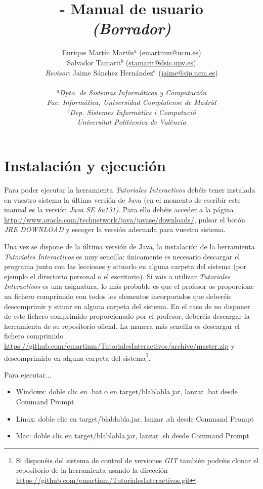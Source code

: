 \documentclass[]{article}
\title{\toolname{} - Manual de usuario \\ \emph{(Borrador)}}
\author{Enrique Martín Martín$^a$ (\url{emartinm@ucm.es}) \\ 
	Salvador Tamarit$^b$ (\url{stamarit@dsic.upv.es}) \\
	\emph{Revisor:} Jaime Sánchez Hernández$^a$ (\url{jaime@sip.ucm.es}) \\~\\[-.4cm]
	\normalsize{\emph{$^a$Dpto. de Sistemas Informáticos y Computación}}\\[-0.1cm]
	\normalsize{\emph{Fac. Informática, Universidad Complutense de Madrid}}\\[-0.1cm]
	\normalsize{\emph{$^b$Dep. Sistemes Informàtics i Computació}}\\[-0.1cm]
	\normalsize{\emph{Universitat Politècnica de València}}\\[-0.1cm]
}
\newcommand{\toolname}{\emph{Tutoriales Interactivos}}
\begin{document}
\maketitle

\tableofcontents

\clearpage

\section{Instalación y ejecución}

Para poder ejecutar la herramienta \toolname{} debéis tener instalada en vuestro sistema la última versión de Java (en el momento de escribir este manual es la versión \emph{Java SE 8u131)}. Para ello debéis acceder a la página \url{http://www.oracle.com/technetwork/java/javase/downloads/}, pulsar el botón \emph{JRE DOWNLOAD} y escoger la versión adecuada para vuestro sistema.

Una vez se dispone de la última versión de Java, la instalación de la herramienta \toolname{} es muy sencilla: únicamente es necesario descargar el programa junto con las lecciones y situarlo en alguna carpeta del sistema (por ejemplo el directorio personal o el escritorio). Si vais a utilizar \toolname{} es una asignatura, lo más probable es que el profesor os proporcione un fichero comprimido con todos los elementos incorporados que deberéis descomprimir y situar en alguna carpeta del sistema. En el caso de no disponer de este fichero comprimido proporcionado por el profesor, deberéis descargar la herramienta de su repositorio oficial. La manera más sencilla es descargar el fichero comprimido \url{https://github.com/emartinm/TutorialesInteractivos/archive/master.zip} y descomprimirlo en alguna carpeta del sistema\footnote{Si disponéis del sistema de control de versiones \emph{GIT} también podréis clonar el repositorio de la herramienta  usando la dirección \url{https://github.com/emartinm/TutorialesInteractivos.git}}.

Para ejecutar...

\begin{itemize}
	\item Windows: doble clic en .bat o en target/blablabla.jar, lanzar .bat desde Command Prompt
	\item Linux: doble clic en target/blablabla.jar, lanzar .sh desde Command Prompt
	\item Mac: doble clic en target/blablabla.jar, lanzar .sh desde Command Prompt
\end{itemize}
\end{document}
